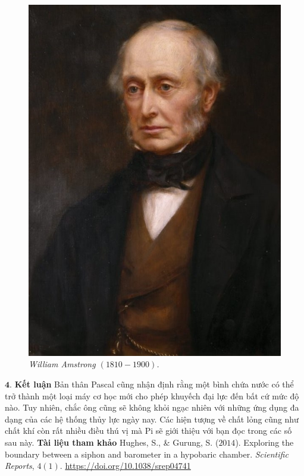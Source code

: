 \begin{multicols}{2}
\begin{figure}[H]
		\includegraphics[width= 1\linewidth]{27}
		\caption{\small\textit{\color{timhieukhoahoc}William Amstrong $(1810 - 1900)$.}}
		\vspace*{-10pt}
	\end{figure}
	$\pmb{4.}$ \textbf{\color{timhieukhoahoc}Kết luận}
	\vskip 0.1cm
	Bản thân Pascal cũng nhận định rằng một bình chứa nước có thể trở thành một loại máy cơ học mới cho phép khuyếch đại lực đến bất cứ mức độ nào. Tuy nhiên, chắc ông cũng sẽ không khỏi ngạc nhiên với những ứng dụng đa dạng của các hệ thống thủy lực ngày nay. Các hiện tượng về chất lỏng cũng như chất khí còn rất nhiều điều thú vị mà Pi sẽ giới thiệu với bạn đọc trong các số sau này.
	\vskip 0.1cm
	\textbf{\color{timhieukhoahoc}Tài liệu tham khảo}
	\vskip 0.1cm
	Hughes, S., \& Gurung, S. ($2014$). Exploring the boundary between a siphon and barometer in a hypobaric chamber. \textit{Scientific Reports}, $4(1)$. \url{https://doi.org/10.1038/srep04741}
\end{multicols}


